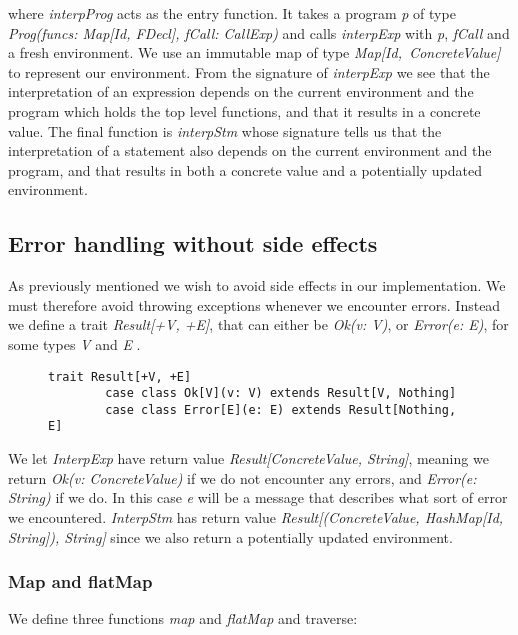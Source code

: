  \noindent where \textsl{interpProg} acts as the entry function. It takes a program \textsl{p} of type \textsl{Prog(funcs: Map[Id, FDecl], fCall: CallExp)} and calls \textsl{interpExp} with \textsl{p}, \textsl{fCall} and a fresh environment. We use an immutable map of type \mbox{\textsl{Map[Id, ConcreteValue]}} to represent our environment. From the signature of \textsl{interpExp} we see that the interpretation of an expression depends on the current environment and the program which holds the top level functions, and that it results in a concrete value. The final function is \textsl{interpStm} whose signature tells us that the interpretation of a statement also depends on the current environment and the program, and that results in both a concrete value and a potentially updated environment. 

\subsection{Error handling without side effects}
 As previously mentioned we wish to avoid side effects in our implementation. We must therefore avoid throwing exceptions whenever we encounter errors.
 Instead we define a trait \textsl{Result[+V, +E]}, that can either be \textsl{Ok(v: V)},  or \textsl{Error(e: E)}, for some types \textsl{V} and \textsl{E} \cite{Chiusano:2014:FPS:2688794}.

\begin{figure}[!h]
	\begin{lstlisting}[style=simple]
		trait Result[+V, +E]
		case class Ok[V](v: V) extends Result[V, Nothing]
		case class Error[E](e: E) extends Result[Nothing, E]
	\end{lstlisting}
\end{figure}

We let \textsl{InterpExp} have return value \textsl{Result[ConcreteValue, String]}, meaning we return \textsl{Ok(v: ConcreteValue)} if we do not encounter any errors, and \textsl{Error(e: String)} if we do. In this case \textsl{e} will be a message that describes what sort of error we encountered. \textsl{InterpStm} has return value 
 \textsl{Result[(ConcreteValue, HashMap[Id, String]), String]} since we also return a potentially updated environment. 

\subsubsection{Map and flatMap}

We define three functions \textsl{map} and \textsl{flatMap} and traverse:

